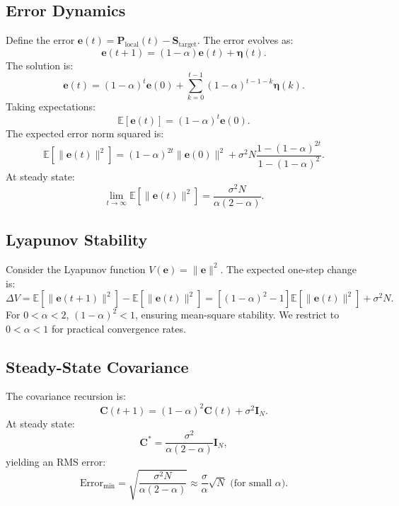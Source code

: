\documentclass[12pt]{article}
\begin{document}
\subsection{Error Dynamics}
Define the error $\mathbf{e}(t) = \mathbf{P}_{\text{local}}(t) - \mathbf{S}_{\text{target}}$. The error evolves as:
\begin{equation}
\mathbf{e}(t+1) = (1-\alpha)\mathbf{e}(t) + \mathbf{\eta}(t).
\label{eq:error}
\end{equation}
The solution is:
\begin{equation}
\mathbf{e}(t) = (1-\alpha)^t \mathbf{e}(0) + \sum_{k=0}^{t-1} (1-\alpha)^{t-1-k} \mathbf{\eta}(k).
\label{eq:error_solution}
\end{equation}
Taking expectations:
\begin{equation}
\mathbb{E}[\mathbf{e}(t)] = (1-\alpha)^t \mathbf{e}(0).
\label{eq:expectation}
\end{equation}
The expected error norm squared is:
\begin{equation}
\mathbb{E}[\|\mathbf{e}(t)\|^2] = (1-\alpha)^{2t} \|\mathbf{e}(0)\|^2 + \sigma^2 N \frac{1 - (1-\alpha)^{2t}}{1 - (1-\alpha)^2}.
\label{eq:norm}
\end{equation}
At steady state:
\begin{equation}
\lim_{t \to \infty} \mathbb{E}[\|\mathbf{e}(t)\|^2] = \frac{\sigma^2 N}{\alpha (2-\alpha)}.
\label{eq:steady_state}
\end{equation}

\subsection{Lyapunov Stability}
Consider the Lyapunov function $V(\mathbf{e}) = \|\mathbf{e}\|^2$. The expected one-step change is:
\begin{equation}
\Delta V = \mathbb{E}[\|\mathbf{e}(t+1)\|^2] - \mathbb{E}[\|\mathbf{e}(t)\|^2] = \left[ (1-\alpha)^2 - 1 \right] \mathbb{E}[\|\mathbf{e}(t)\|^2] + \sigma^2 N.
\label{eq:lyapunov}
\end{equation}
For $0 < \alpha < 2$, $(1-\alpha)^2 < 1$, ensuring mean-square stability. We restrict to $0 < \alpha < 1$ for practical convergence rates.

\subsection{Steady-State Covariance}
The covariance recursion is:
\begin{equation}
\mathbf{C}(t+1) = (1-\alpha)^2 \mathbf{C}(t) + \sigma^2 \mathbf{I}_N.
\label{eq:covariance}
\end{equation}
At steady state:
\begin{equation}
\mathbf{C}^* = \frac{\sigma^2}{\alpha (2-\alpha)} \mathbf{I}_N,
\label{eq:covariance_steady}
\end{equation}
yielding an RMS error:
\begin{equation}
\text{Error}_{\min} = \sqrt{\frac{\sigma^2 N}{\alpha (2-\alpha)}} \approx \frac{\sigma}{\alpha} \sqrt{N} \text{ (for small } \alpha\text{)}.
\label{eq:rms_error}
\end{equation}
\end{document}
